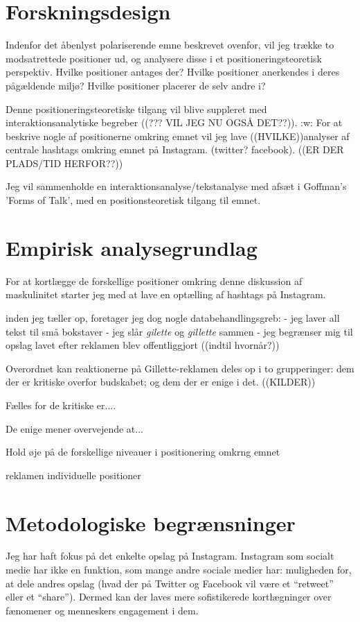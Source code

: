 \section{Forskningsdesign} 

Indenfor det åbenlyst polariserende emne beskrevet ovenfor, vil
jeg trække to modsatrettede positioner ud, og analysere disse i et
positioneringsteoretisk perspektiv. Hvilke positioner antages
der? Hvilke positioner anerkendes i deres pågældende miljø? Hvilke
positioner placerer de selv andre i?

Denne positioneringsteoretiske tilgang vil blive suppleret med
interaktionsanalytiske begreber ((??? VIL JEG NU OGSÅ DET??)).
:w: For at beskrive nogle af positionerne omkring emnet vil jeg
lave ((HVILKE))analyser af centrale hashtags omkring emnet på
Instagram.   (twitter?  facebook). ((ER DER PLADS/TID HERFOR??))


Jeg vil sammenholde en interaktionsanalyse/tekstanalyse med afsæt
i Goffman's 'Forms of Talk', med en positionsteoretisk tilgang til
emnet. 


\section{Empirisk analysegrundlag}

For at kortlægge de forskellige positioner omkring denne 
diskussion af maskulinitet starter jeg med at lave en optælling af 
hashtags på Instagram.

inden jeg tæller op, foretager jeg dog nogle databehandlingsgreb:
- jeg laver all tekst til små bokstaver
- jeg slår \emph{gilette} og \emph{gillette} sammen
- jeg begrænser mig til opslag lavet efter reklamen blev
offentliggjort ((indtil hvornår?))


Overordnet kan reaktionerne på Gillette-reklamen deles op i to
grupperinger: dem der er kritiske overfor budskabet; og dem der er
enige i det. ((KILDER))

Fælles for de kritiske er....

De enige mener overvejende at...

Hold øje på de forskellige niveauer i positionering omkrng emnet

reklamen
individuelle positioner

\section{Metodologiske begrænsninger}
Jeg har haft fokus på det enkelte opslag på Instagram. Instagram 
som socialt medie har ikke en funktion, som mange andre sociale 
medier har: muligheden for, at dele andres opslag (hvad der på 
Twitter og Facebook vil være et “retweet” eller et “share”).  
Dermed kan der laves mere sofistikerede kortlægninger over 
fænomener og menneskers engagement i dem.

